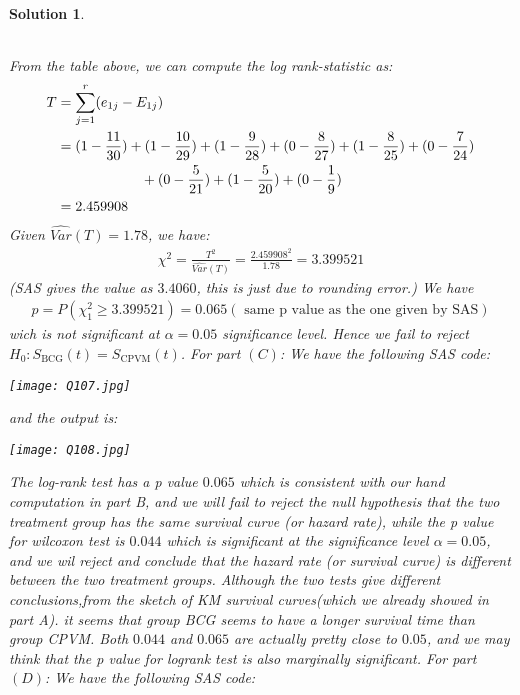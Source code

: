 \documentclass[11pt]{article}
\newtheorem{sol}{Solution}
\begin{document}
\begin{sol}
\begin{tabular}{|c|c|c|c|c|c|c|c|c|}
		 \hline
	\end{tabular}
	\vskip 2mm
	From the table above, we can compute the log rank-statistic as:
	\begin{align*}
		T &= \sum_{j = 1}^r(e_{1j} - E_{1j})\\
		&= (1 - \frac{11}{30}) +(1 - \frac{10}{29}) +(1 - \frac{9}{28}) + (0 - \frac{8}{27}) + (1 - \frac{8}{25}) + (0 - \frac{7}{24}) \\
		&\ \hskip 2cm + (0 - \frac{5}{21}) + (1 - \frac{5}{20}) + (0 - \frac{1}{9})\\
		&= 2.459908
	\end{align*}
	Given $\hat{Var}(T) = 1.78$, we have:
	\begin{align*}
		\chi^2 = \frac{T^2}{\hat{Var}(T)} = \frac{2.459908^2}{1.78}= 3.399521
	\end{align*}
	(SAS gives the value as $3.4060$, this is just due to rounding error.)\vskip 2mm
	We have 
	\begin{align*}
		p = P(\chi^2_1 \geq 3.399521)= 0.065 (\text{ same p value as the one given by SAS})
	\end{align*}
	wich is not significant at $\alpha = 0.05$ significance level.
	Hence we fail to reject $H_0: S_{\text{BCG}}(t) =S_{\text{CPVM}}(t)$.
	\vskip 2mm
	For part $(C)$:\vskip 2mm
	We have the following SAS code:
	\begin{center}
		\texttt{[image: Q107.jpg]}
	\end{center}
	and the output is:
	\begin{center}
		\texttt{[image: Q108.jpg]}
	\end{center}
	The log-rank test has a p value $0.065$ which is consistent with our hand computation in part B, and we will fail to reject the null hypothesis that the two treatment group has the same survival curve (or hazard rate), while the p value for wilcoxon test is $ 0.044$ which is significant at the significance level $\alpha = 0.05$, and we wil reject and conclude that the hazard rate (or survival curve) is different between the two treatment groups.\vskip 2mm
	Although the two tests give different conclusions,from the sketch of KM survival curves(which we already showed in part A). it seems that group BCG seems to have a longer survival time than group CPVM. Both $0.044$ and $0.065$ are actually pretty close to $0.05$, and we may think that the p value for logrank test is also marginally significant.
	\vskip 2mm
	For part $(D)$:\vskip 2mm
	We have the following SAS code:
	\begin{center}

\end{center}
\end{sol}
\end{document}
